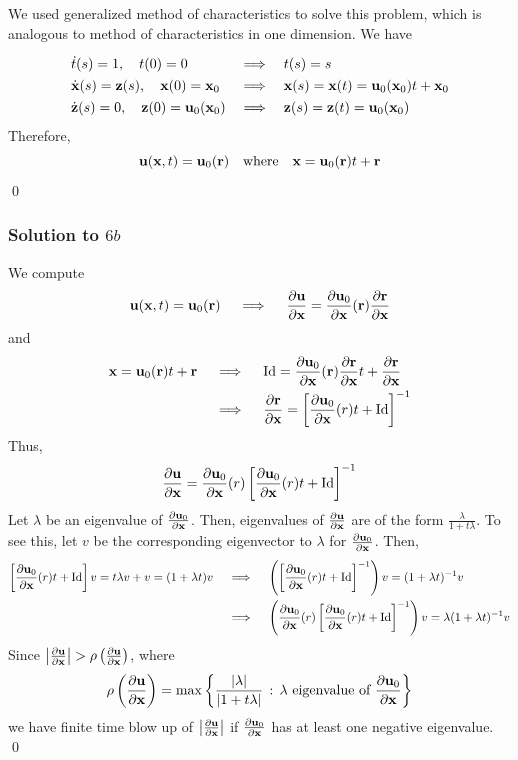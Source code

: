 We used generalized method of characteristics to solve this problem, which is analogous to method of characteristics in one dimension. We have
$$
\begin{array}{lll}
\asep
\dot{t}(s) = 1, \quad t(0) = 0 & \implies & t(s) = s \\ \asep
\dot{\vx}(s) = \vz(s), \quad \vx(0) = \vx_0 & \implies & \vx(s) = \vx(t) = \vu_0(\vx_0)t + \vx_0 \\ \asep
\dot{\vz}(s) = 0, \quad \vz(0) = \vu_0(\vx_0) & \implies & \vz(s) = \vz(t) = \vu_0(\vx_0)
\end{array}
$$
Therefore,
$$ \textbf{u}(\textbf{x},t) = \textbf{u}_0 (\textbf{r}) \quad \text{where} \quad \textbf{x} = \textbf{u}_0(\textbf{r}) t + \textbf{r} $$
\hfill \qed

\subsubsection*{Solution to $6b$}

We compute
$$ \textbf{u}(\textbf{x},t) = \textbf{u}_0(\textbf{r}) \quad \implies \quad \frac{\partial \textbf{u}}{\partial \textbf{x}} = \frac{\partial \textbf{u}_0}{\partial \textbf{x}}(\textbf{r}) \frac{\partial \textbf{r}}{\partial \textbf{x}} $$
and
\begin{align*}
\textbf{x} = \textbf{u}_0(\textbf{r}) t + \textbf{r} \quad &\implies \quad \operatorname{Id} = \frac{\partial \textbf{u}_0}{\partial \textbf{x}}(\textbf{r}) \frac{\partial \textbf{r}}{\partial \textbf{x}} t + \frac{\partial \textbf{r}}{\partial \textbf{x}} \\
&\implies \quad \frac{\partial \textbf{r}}{\partial \textbf{x}} = \left[ \frac{\partial \textbf{u}_0}{\partial \textbf{x}}(r) t + \operatorname{Id} \right]^{-1}
\end{align*}
Thus,
$$ \frac{\partial \textbf{u}}{\partial \textbf{x}} = \frac{\partial \textbf{u}_0}{\partial \textbf{x}} (r) \left[ \frac{\partial \textbf{u}_0}{\partial \textbf{x}}(r) t + \operatorname{Id} \right]^{-1} $$
Let $\lambda$ be an eigenvalue of $\frac{\partial \textbf{u}_0}{\partial \textbf{x}}$. Then, eigenvalues of $\frac{\partial \textbf{u}}{\partial \textbf{x}}$ are of the form $\frac{\lambda}{1 + t\lambda}$. To see this, let $v$ be the corresponding eigenvector to $\lambda$ for $\frac{\partial \textbf{u}_0}{\partial \textbf{x}}$. Then,
\begin{align*}
\left[ \frac{\partial \textbf{u}_0}{\partial \textbf{x}}(r) t + \operatorname{Id} \right] v = t\lambda v + v = (1 + \lambda t) v \quad &\implies \quad \left(\left[ \frac{\partial \textbf{u}_0}{\partial \textbf{x}}(r) t + \operatorname{Id} \right]^{-1} \right)v = (1+\lambda t)^{-1} v \\
&\implies \quad \left(\frac{\partial \textbf{u}_0}{\partial \textbf{x}} (r) \left[ \frac{\partial \textbf{u}_0}{\partial \textbf{x}}(r) t + \operatorname{Id} \right]^{-1} \right)v = \lambda (1+ \lambda t)^{-1} v
\end{align*}
Since $\left| \frac{\partial \textbf{u}}{\partial \textbf{x}} \right| > \rho\left( \frac{\partial \textbf{u}}{\partial \textbf{x}} \right)$, where
$$ \rho\left( \frac{\partial \textbf{u}}{\partial \textbf{x}} \right) = \max \left\{ \frac{|\lambda|}{|1+t\lambda|} \, : \, \lambda \,\, \text{eigenvalue of} \,\, \frac{\partial \textbf{u}_0}{\partial \textbf{x}} \right\}$$
we have finite time blow up of $\left| \frac{\partial \textbf{u}}{\partial \textbf{x}} \right|$ if $ \frac{\partial \textbf{u}_0}{\partial \textbf{x}} $ has at least one negative eigenvalue. \hfill \qed














